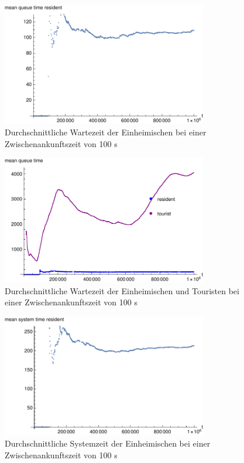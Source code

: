 \begin{figure}[htpb]
	\centering
	\includegraphics[width=0.8\textwidth]{abbildungen/1_Phone_VIP/Arrival_100_Serve_100_dur_1000000_Skip_0/MeanQueueTimeResident.pdf}
	\caption{Durchschnittliche Wartezeit der Einheimischen bei einer Zwischenankunftszeit von 100 s}
	\label{fig:1_Phone_VIP_100_MeanQueueTime_Resident}
\end{figure}

\begin{figure}[htpb]
	\centering
	\includegraphics[width=0.8\textwidth]{abbildungen/1_Phone_VIP/Arrival_100_Serve_100_dur_1000000_Skip_0/MeanQueueTimeTouristAndResident.pdf}
	\caption{Durchschnittliche Wartezeit der Einheimischen und Touristen bei einer Zwischenankunftszeit von 100 s}
	\label{fig:1_Phone_VIP_100_MeanQueueTime_All}
\end{figure}


\begin{figure}[htpb]
	\centering
	\includegraphics[width=0.8\textwidth]{abbildungen/1_Phone_VIP/Arrival_100_Serve_100_dur_1000000_Skip_0/MeanSystemTimeResident.pdf}
	\caption{Durchschnittliche Systemzeit der Einheimischen bei einer Zwischenankunftszeit von 100 s}
	\label{fig:1_Phone_VIP_100_MeanSystemTime_Resident}
\end{figure}

